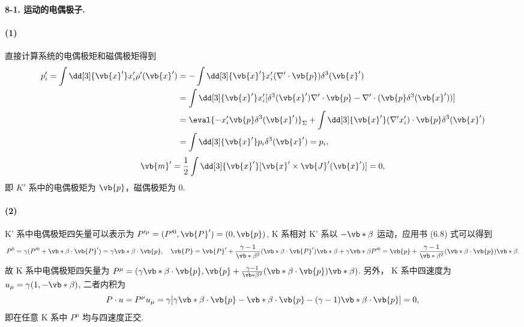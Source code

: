 \documentclass[12pt]{article}
\begin{document}
\paragraph{8-1. 运动的电偶极子.}
\paragraph{(1)}
直接计算系统的电偶极矩和磁偶极矩得到
\begin{align*}
  p'_i = \int \dd[3]{\vb{x}'} x'_i \rho'(\vb{x}') &= -\int \dd[3]{\vb{x}'} x'_i (\nabla' \cdot \vb{p}) \delta^3(\vb{x}') \\
  &= \int \dd[3]{\vb{x}'} x'_i [\delta^3(\vb{x}') \nabla' \cdot \vb{p} - \nabla' \cdot (\vb{p} \delta^3(\vb{x}'))] \\
  &= \eval{-x'_i \vb{p} \delta^3(\vb{x}')}_{\Sigma} + \int \dd[3]{\vb{x}'} (\nabla' x'_i) \cdot \vb{p} \delta^3(\vb{x}') \\
  &= \int \dd[3]{\vb{x}'} p_i \delta^3(\vb{x}') = p_i,
\end{align*}
\begin{equation*}
  \vb{m}' = \frac{1}{2} \int \dd[3]{\vb{x}'} [\vb{x}' \times \vb{J}'(\vb{x}')] = 0,
\end{equation*}
即 $K'$ 系中的电偶极矩为 $\vb{p}$，磁偶极矩为 0.

\paragraph{(2)}
K' 系中电偶极矩四矢量可以表示为 $P'^{\mu} = (P'^0, \vb{P}') = (0, \vb{p})$, K 系相对 K' 系以 $-\vb*{\beta}$ 运动，应用书 (6.8) 式可以得到
\begin{equation*}
  P^0 = \gamma (P'^0 + \vb*{\beta} \cdot \vb{P}') = \gamma \vb*{\beta} \cdot \vb{p}, \quad \vb{P} = \vb{P}' + \frac{\gamma - 1}{\vb*{\beta}^2} (\vb*{\beta} \cdot \vb{P}')\vb*{\beta} + \gamma \vb*{\beta} P'^0 = \vb{p} + \frac{\gamma - 1}{\vb*{\beta}^2} (\vb*{\beta} \cdot \vb{p}) \vb*{\beta}.
\end{equation*}
故 K 系中电偶极矩四矢量为 $P^{\mu} = (\gamma \vb*{\beta} \cdot \vb{p}, \vb{p} + \frac{\gamma - 1}{\vb*{\beta}^2} (\vb*{\beta} \cdot \vb{p}) \vb*{\beta})$.
另外， K 系中四速度为 $u_{\mu} = \gamma(1, -\vb*{\beta})$, 二者内积为
\begin{equation*}
  P \cdot u = P^{\mu} u_{\mu} = \gamma[\gamma \vb*{\beta} \cdot \vb{p} - \vb*{\beta} \cdot \vb{p} - (\gamma - 1) \vb*{\beta} \cdot \vb{p}] = 0,
\end{equation*}
即在任意 K 系中 $P^{\mu}$ 均与四速度正交.
\end{document}
